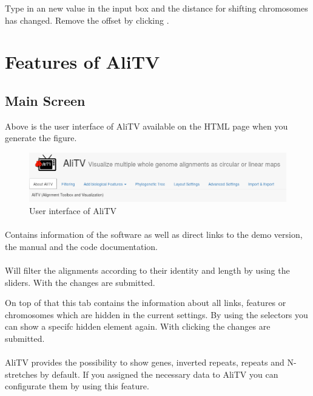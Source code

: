 \documentclass[a4paper]{scrartcl}
\begin{document}
Type in an new value in the input box and the distance for shifting chromosomes has changed. Remove the offset by clicking .

\newpage
\section*{Features of AliTV}
\subsection*{Main Screen}
Above is the user interface of AliTV available on the HTML page when you generate the figure.
\begin{figure}[H]
	\centering
	\includegraphics[width=14cm]{userInterface.png}
	\caption{User interface of AliTV}
\end{figure}
\paragraph*{}
Contains information of the software as well as direct links to the demo version, the manual and the code documentation.

\paragraph*{}
Will filter the alignments according to their identity and length by using the sliders. With  the changes are submitted.

On top of that this tab contains the information about all links, features or chromosomes which are hidden in the current settings. By using the selectors you can show a specifc hidden element again. With clicking  the changes are submitted.

\paragraph*{}
AliTV provides the possibility to show genes, inverted repeats, repeats and N-stretches by default. If you assigned the necessary data to AliTV you can configurate them by using this feature. 
\end{document}
